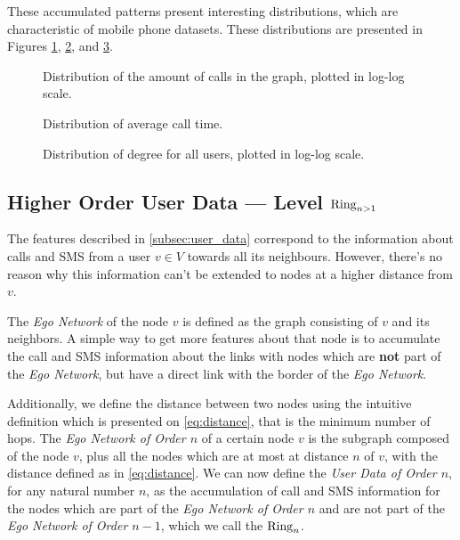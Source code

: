 These accumulated patterns present interesting distributions,
which are characteristic of mobile phone datasets. These distributions are presented in Figures \ref{fig:callsms}, \ref{fig:time}, and \ref{fig:contacts}.

\begin{figure}
\caption{Distribution of the amount of calls in the graph, plotted in log-log scale.}
\label{fig:callsms}
\end{figure}

\begin{figure}
\caption{Distribution of average call time.}
\label{fig:time}
\end{figure}

\begin{figure}
\caption{Distribution of degree for all users, plotted in log-log scale.}
\label{fig:contacts}
\end{figure}


\subsection{Higher Order User Data --- Level $\operatorname{Ring}_{n > 1}$}

\label{subsec:higherorderuserdata}

The features described in \cref{subsec:user_data} correspond to the information about calls and SMS from a user $v \in V$ towards all its neighbours. 
However, there's no reason why this information can't be extended to nodes at a higher distance from $v$.

The \emph{Ego Network} of the node $v$ is defined as the graph consisting of $v$ and its neighbors. A simple way to get more features about that node is to accumulate the call and SMS information about the links with nodes which are \textbf{not} part of the \emph{Ego Network}, but have a direct link with the border of the \emph{Ego Network}.

Additionally, we define the distance between two nodes using the intuitive definition which is presented on \cref{eq:distance}, that is the minimum number of hops.
The \emph{Ego Network of Order $n$} of a certain node $v$ is the subgraph composed of the node $v$, plus all the nodes which are at most at distance $n$ of $v$, with the distance defined as in \cref{eq:distance}.
We can now define the \emph{User Data of Order $n$}, for any natural number $n$, as the accumulation of call and SMS information for the nodes which are part of the \emph{Ego Network of Order $n$} and are not part of the \emph{Ego Network of Order $n - 1$}, which we call the $\operatorname{Ring}_n$.


